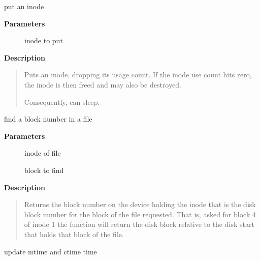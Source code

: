 \documentclass[a4paper,8pt,english]{sphinxmanual}
\begin{document}
\begin{fulllineitems}
\label{filesystems/index:c.iput}
put an inode

\end{fulllineitems}


\textbf{Parameters}
\begin{description}
\item[{}] \leavevmode
inode to put

\end{description}

\textbf{Description}
\begin{quote}

Puts an inode, dropping its usage count. If the inode use count hits
zero, the inode is then freed and may also be destroyed.

Consequently, {\hyperref[filesystems/index:c.iput]{\emph{}}} can sleep.
\end{quote}

\begin{fulllineitems}
\label{filesystems/index:c.bmap}
find a block number in a file

\end{fulllineitems}


\textbf{Parameters}
\begin{description}
\item[{}] \leavevmode
inode of file

\item[{}] \leavevmode
block to find

\end{description}

\textbf{Description}
\begin{quote}

Returns the block number on the device holding the inode that
is the disk block number for the block of the file requested.
That is, asked for block 4 of inode 1 the function will return the
disk block relative to the disk start that holds that block of the
file.
\end{quote}

\begin{fulllineitems}
\label{filesystems/index:c.file_update_time}
update mtime and ctime time

\end{fulllineitems}
\end{document}
